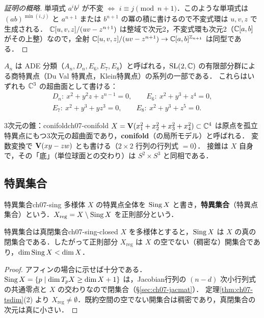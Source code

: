 \begin{proof}[証明の概略]
単項式 $a^ib^j$ が不変 $\iff$ $i\equiv j\pmod{n+1}$．このような単項式は $(ab)^{\min(i,j)}$ と $a^{n+1}$ または $b^{n+1}$ の冪の積に書けるので不変式環は $u,v,z$ で生成される．
$\mathbb{C}[u,v,z]/(uv-z^{n+1})$ は整域で次元2，不変式環も次元2（$\mathbb{C}[a,b]$ がその上整）なので，全射 $\mathbb{C}[u,v,z]/(uv-z^{n+1})\to\mathbb{C}[a,b]^{\mathbb{Z}_{n+1}}$ は同型である．
\end{proof}

$A_n$ は ADE 分類（$A_n,D_n,E_6,E_7,E_8$）と呼ばれる，$\operatorname{SL}(2,\mathbb{C})$ の有限部分群による商特異点（Du Val 特異点，Klein特異点）の系列の一部である．
これらはいずれも $\mathbb{C}^3$ の超曲面として書ける：
\begin{gather*}
  D_n:\ x^2+y^2z+z^{n-1}=0,\qquad E_6:\ x^2+y^3+z^4=0,\\
  E_7:\ x^2+y^3+yz^3=0,\qquad E_8:\ x^2+y^3+z^5=0.
\end{gather*}

\begin{myex}{3次元の錐：conifold}{ch07-conifold}
$X=\mathbf{V}(x_1^2+x_2^2+x_3^2+x_4^2)\subset\mathbb{C}^4$ は原点を孤立特異点にもつ3次元の超曲面であり，\textbf{conifold}（の局所モデル）と呼ばれる．
変数変換で $\mathbf{V}(xy-zw)$ とも書ける（$2\times2$ 行列の行列式 $=0$）．
接錐は $X$ 自身で，その「底」（単位球面との交わり）は $S^2\times S^3$ と同相である．
\end{myex}

\subsection{特異集合}

\begin{mydef}{特異集合}{ch07-sing}
多様体 $X$ の特異点全体を $\operatorname{Sing} X$ と書き，\textbf{特異集合}（特異点集合）という．$X_{\mathrm{reg}}=X\setminus\operatorname{Sing} X$ を正則部分という．
\end{mydef}

\begin{mythm}{特異集合は真閉集合}{ch07-sing-closed}
$X$ を多様体とすると，$\operatorname{Sing} X$ は $X$ の真の閉集合である．したがって正則部分 $X_{\mathrm{reg}}$ は $X$ の空でない（稠密な）開集合であり，$\dim\operatorname{Sing} X<\dim X$．
\end{mythm}

\begin{proof}
アフィンの場合に示せば十分である．$\operatorname{Sing} X=\{p\mid\dim T_pX\ge\dim X+1\}$ は，Jacobian行列の $(n-d)$ 次小行列式の共通零点と $X$ の交わりなので閉集合（\S\ref{sec:ch07-jacmat}）．
定理\ref{thm:ch07-tsdim}(2) より $X_{\mathrm{reg}}\neq\emptyset$．既約空間の空でない開集合は稠密であり，真閉集合の次元は真に小さい．
\end{proof}


